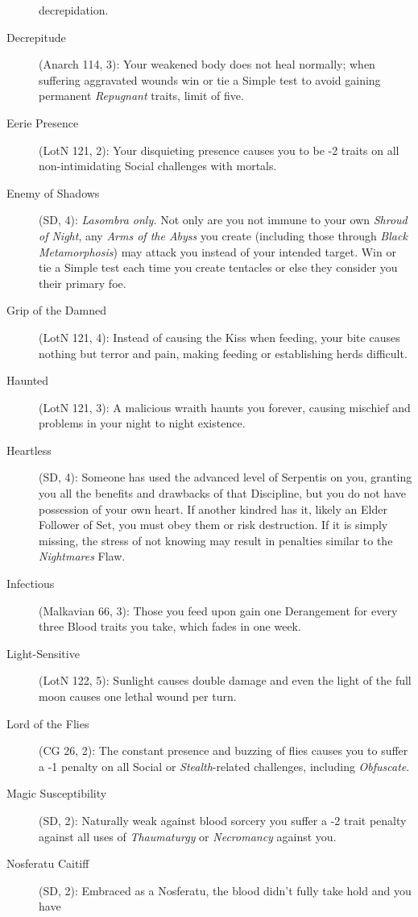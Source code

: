 \begin{description}
	decrepidation.
	\item[Decrepitude] (Anarch 114, 3):  Your weakened body does not heal normally; when suffering 
	aggravated wounds win or tie a Simple test to avoid gaining permanent \emph{Repugnant} traits, limit 
	of five.
	\item[Eerie Presence] (LotN 121, 2):  Your disquieting presence causes you to be -2 traits on all 
	non-intimidating Social challenges with mortals.
	\item[Enemy of Shadows] (SD, 4):  \emph{Lasombra only.}  Not only are you not immune to your own 
	\emph{Shroud of Night}, any \emph{Arms of the Abyss} you create (including those through 
	\emph{Black Metamorphosis}) may attack you instead of your intended target.  Win or tie a Simple 
	test each time you create tentacles or else they consider you their primary foe.
	\item[Grip of the Damned] (LotN 121, 4):  Instead of causing the Kiss when feeding, your bite 
	causes nothing but terror and pain, making feeding or establishing herds difficult.
	\item[Haunted] (LotN 121, 3):  A malicious wraith haunts you forever, causing mischief and problems 
	in your night to night existence.
	\item[Heartless] (SD, 4):  Someone has used the advanced level of Serpentis on you, granting 
	you all the benefits and drawbacks of that Discipline, but you do not have possession of your own heart.  
	If another kindred has it, likely an Elder Follower of Set, you must obey them or risk destruction.  If 
	it is simply missing, the stress of not knowing may result in penalties similar to the \emph{Nightmares} 
	Flaw.
	\item[Infectious] (Malkavian 66, 3):  Those you feed upon gain one Derangement for every three 
	Blood traits you take, which fades in one week.
	\item[Light-Sensitive] (LotN 122, 5):  Sunlight causes double damage and even the light of the full 
	moon causes one lethal wound per turn.
	\item[Lord of the Flies] (CG 26, 2):  The constant presence and buzzing of flies causes you to suffer 
	a -1 penalty on all Social or \emph{Stealth}-related challenges, including \emph{Obfuscate}.
	\item[Magic Susceptibility] (SD, 2):  Naturally weak against blood sorcery you suffer a -2 
	trait penalty against all uses of \emph{Thaumaturgy} or \emph{Necromancy} against you.
	\item[Nosferatu Caitiff] (SD, 2):  Embraced as a Nosferatu, the blood didn't fully take hold and you have 

\end{description}
